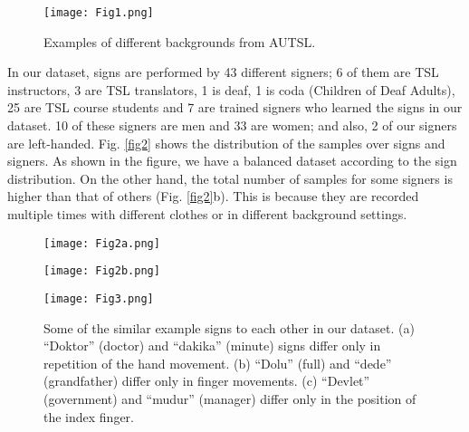 \documentclass[11pt, a4paper, singlecolumn]{article}
\begin{document}
\begin{figure}
	\centering
	\texttt{[image: Fig1.png]}
	\caption{Examples of different backgrounds from AUTSL.}
	\label{fig1}
\end{figure}

In our dataset, signs are performed by 43 different signers; 6 of them are TSL instructors, 3 are TSL translators, 1 is deaf, 1 is coda (Children of Deaf Adults), 25 are TSL course students and 7 are trained signers who learned the signs in our dataset. 10 of these signers are men and 33 are women; and also, 2 of our signers are left-handed. Fig. \ref{fig2} shows the distribution of the samples over signs and signers. As shown in the figure, we have a balanced dataset according to the sign distribution. On the other hand, the total number of samples for some signers is higher than that of others (Fig. \ref{fig2}b). This is because they are recorded multiple times with different clothes or in different background settings.

\begin{figure*}
	\centering
	\begin{subfigure}{0.3\textwidth}
		\texttt{[image: Fig2a.png]}			
		\caption{}
		\label{fig:distrubutions_a} 
	\end{subfigure}		
	\begin{subfigure}{0.3\textwidth}
		\texttt{[image: Fig2b.png]}
		\caption{}
		\label{fig:distrubutions_b} 
	\end{subfigure}			
	\caption{Distribution of (a) number of samples performed by each signer and (b) number of samples for each sign.}
	\label{fig2}       \end{figure*}



\begin{figure}
	\centering
	\texttt{[image: Fig3.png]}
	\caption{Some of the similar example signs to each other in our dataset. (a) “Doktor” (doctor) and “dakika” (minute) signs differ only in repetition of the hand movement. (b) “Dolu” (full) and “dede” (grandfather) differ only in finger movements. (c) “Devlet” (government) and “mudur” (manager) differ only in the position of the index finger.}
	\label{fig3}
\end{figure}
\end{document}
